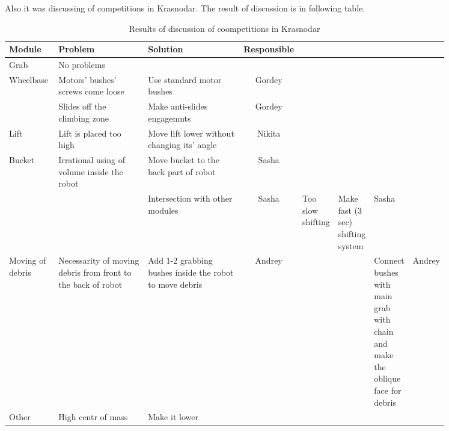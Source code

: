 Also it was discussing of competitions in Krasnodar. The result of discussion is in following table.
\begin{table}[H]
	\caption{Results of discussion of coompetitions in Krasnodar}
	\label{tabular:meetingKRA12.12}
	\begin{center}
		\begin{tabular}{p{0.12\linewidth}|p{0.35\linewidth}|p{0.38\linewidth}|c}
			Module & Problem	& Solution	& Responsible \\
			\hline
			Grab	& No problems	& &	\\
			\hline
			Wheelbase &	Motors' bushes' screws come loose &	Use standard motor bushes &	Gordey \\
			& Slides off the climbing zone &	Make anti-slides engagemnts	& Gordey \\
			\hline
			Lift	& Lift is placed too high	& Move lift lower without changing its' angle	& Nikita \\
			\hline
			Bucket	& Irrational using of volume inside the robot &	Move bucket to the back part of robot	& Sasha \\
			& & Intersection with other modules		& Sasha
			& Too slow shifting	& Make fast (3 sec) shifting system	& Sasha \\
			\hline
			Moving of debris &	Necessarity of moving debris from front to the back of robot &	Add 1-2 grabbing bushes inside the robot to move debris	& Andrey &
			& & Connect bushes with main grab with chain and make the oblique face for debris &	Andrey \\
			\hline
			Other	& High centr of mass	& Make it lower	& \\
				
		\end{tabular}
	\end{center}
\end{table}

